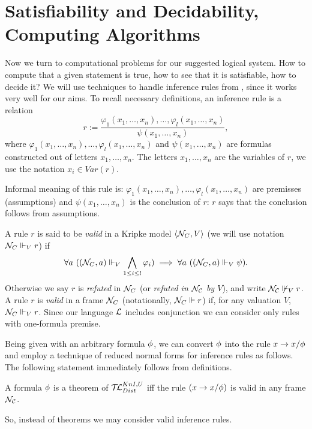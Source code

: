 \documentclass[runningheads]{llncs}
\begin{document}
\section{Satisfiability and Decidability, Computing Algorithms}

Now we turn  to computational problems for our suggested logical system.
How to compute that a given statement is true, how to see that it is satisfiable, how to decide it?
We will use techniques to handle
inference rules from \cite{rint,rit071,vr11,vrlc}, since it works very well for our aims. To recall necessary definitions,
an inference rule is
 a relation
 \[ {r}:= \frac{\varphi_1( x_1, \dots ,
x_n), \dots , \varphi_l( x_1, \dots , x_n)}{\psi(x_1, \dots , x_n)},
\]
where $\varphi_1(x_1, \dots , x_n), \dots , \varphi_l( x_1, \dots ,
x_n)$ and $\psi(x_1, \dots , x_n)$ are
 formulas constructed out of
letters $x_1, \dots , x_n$.
The letters $x_1, \dots , x_n$ are the
variables of ${r}$, we use the notation $x_i \in Var(r)$.

Informal meaning of this rule is: $\varphi_1( x_1, \dots ,
x_n), \dots , \varphi_l( x_1, \dots , x_n)$ are premisses (assumptions) and $\psi(x_1, \dots , x_n)$ is the conclusion of $r$:
$r$ says that the conclusion follows from assumptions.



A rule
  $r$ is said to be \emph{valid} in
a Kripke model $\langle {\mathcal{N}_C}, V \rangle$
(we will use notation  ${\mathcal{N}_C}\Vdash_V {r}$) if
 \[
\forall a \ (({\mathcal{N}_C,a}) \Vdash_V \bigwedge_{1\leq i \leq
l}\varphi_i)
\implies \forall a \ (({\mathcal{N}_C},a) \Vdash_V \psi).
\]
Otherwise we say ${r}$ is \emph{refuted} in $\mathcal{N}_C$ (or
\emph{refuted in $\mathcal{N_C}$ by $V$}), and write ${\mathcal{N_C}}\not\Vdash_V {r}$. A
rule ${r}$ is \emph{valid} in a frame ${\mathcal{N}_C}$ (notationally,
${\mathcal{N}_C }\Vdash {r}$) if, for any valuation $V$, ${\mathcal{N}_C}\Vdash_V {r}$.
Since our language $\mathcal{L}$ includes conjunction we can consider only
rules with one-formula premise.

 Being given with an arbitrary formula $\phi$, we can convert $\phi$ into the
  rule $x \to x / \phi$
  and employ a technique of reduced normal forms for inference
rules as follows. The following statement immediately follows from definitions.

\begin{lemma} \label{p1}
A formula $\phi$ is a theorem of $\mathcal{T\!L}^{KnI,U}_{Dist}$
iff the rule $({x \to x / \phi})$ is valid in any frame $\mathcal{N_C}$.
\end{lemma}

So, instead of theorems we may consider valid inference rules.
\end{document}
